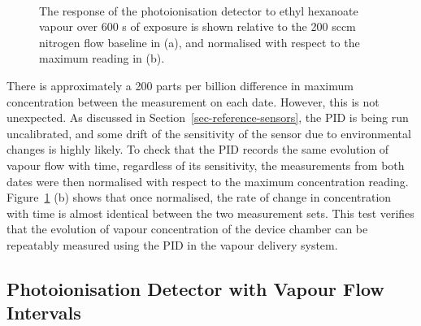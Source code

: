 \documentclass[
  a4paper,
]{scrbook}
\begin{document}
\begin{figure}
\begin{minipage}[t]{0.85\linewidth}
{{}

}

\end{minipage}%
%
\begin{minipage}[t]{0.07\linewidth}

{\centering 

~

}

\end{minipage}%

\caption[The response of the photoionisation detector to ethyl hexanoate
vapour relative to the 200 sccm nitrogen flow baseline over 600 s of
exposure, both unnormalised and normalised to the maximum
reading.]{\label{fig-PID-EtHex-response}The response of the
photoionisation detector to ethyl hexanoate vapour over 600 s of
exposure is shown relative to the 200 sccm nitrogen flow baseline in
(a), and normalised with respect to the maximum reading in (b).}

\end{figure}

There is approximately a 200 parts per billion difference in maximum
concentration between the measurement on each date. However, this is not
unexpected. As discussed in Section~\ref{sec-reference-sensors}, the PID
is being run uncalibrated, and some drift of the sensitivity of the
sensor due to environmental changes is highly likely. To check that the
PID records the same evolution of vapour flow with time, regardless of
its sensitivity, the measurements from both dates were then normalised
with respect to the maximum concentration reading.
Figure~\ref{fig-PID-EtHex-response} (b) shows that once normalised, the
rate of change in concentration with time is almost identical between
the two measurement sets. This test verifies that the evolution of
vapour concentration of the device chamber can be repeatably measured
using the PID in the vapour delivery system.

\hypertarget{photoionisation-detector-with-vapour-flow-intervals}{%
\subsection{Photoionisation Detector with Vapour Flow
Intervals}\label{photoionisation-detector-with-vapour-flow-intervals}}
\end{document}
